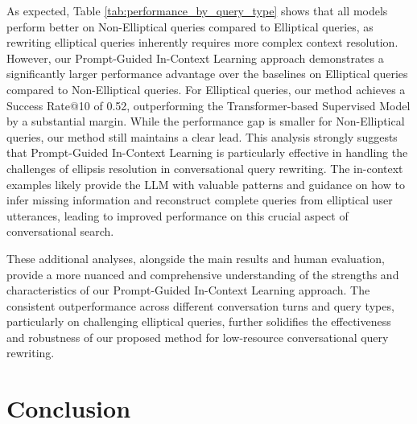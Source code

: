 As expected, Table \ref{tab:performance_by_query_type} shows that all models perform better on Non-Elliptical queries compared to Elliptical queries, as rewriting elliptical queries inherently requires more complex context resolution.  However, our Prompt-Guided In-Context Learning approach demonstrates a significantly larger performance advantage over the baselines on Elliptical queries compared to Non-Elliptical queries.  For Elliptical queries, our method achieves a Success Rate@10 of 0.52, outperforming the Transformer-based Supervised Model by a substantial margin.  While the performance gap is smaller for Non-Elliptical queries, our method still maintains a clear lead.  This analysis strongly suggests that Prompt-Guided In-Context Learning is particularly effective in handling the challenges of ellipsis resolution in conversational query rewriting. The in-context examples likely provide the LLM with valuable patterns and guidance on how to infer missing information and reconstruct complete queries from elliptical user utterances, leading to improved performance on this crucial aspect of conversational search.

These additional analyses, alongside the main results and human evaluation, provide a more nuanced and comprehensive understanding of the strengths and characteristics of our Prompt-Guided In-Context Learning approach. The consistent outperformance across different conversation turns and query types, particularly on challenging elliptical queries, further solidifies the effectiveness and robustness of our proposed method for low-resource conversational query rewriting.




\section{Conclusion}

